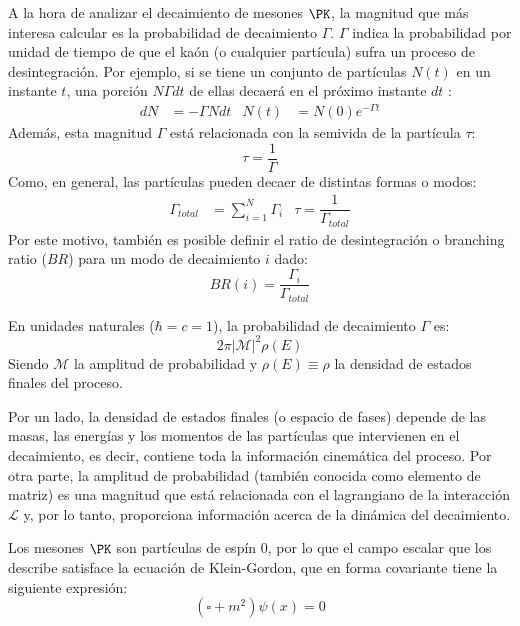 A la hora de analizar el decaimiento de mesones $\PK$, la magnitud que más interesa calcular es la probabilidad de decaimiento $\Gamma$. $\Gamma$ indica la probabilidad por unidad de tiempo de que el kaón (o cualquier partícula) sufra un proceso de desintegración. Por ejemplo, si se tiene un conjunto de partículas $N(t)$ en un instante $t$, una porción $N\Gamma dt$ de ellas decaerá en el próximo instante $dt$ \cite{Griffiths2008}:
\begin{align}
dN &= -\Gamma Ndt & N(t) &= N(0)e^{-\Gamma t}
\end{align}
Además, esta magnitud $\Gamma$ está relacionada con la semivida de la partícula $\tau$:
\begin{equation}
\tau=\dfrac{1}{\Gamma}
\end{equation}
Como, en general, las partículas pueden decaer de distintas formas o modos:
\begin{align}
\Gamma_{total} &= \sum_{i=1}^N \Gamma_i & \tau=\dfrac{1}{\Gamma_{total}}
\end{align}
Por este motivo, también es posible definir el ratio de desintegración o branching ratio ($BR$) para un modo de decaimiento $i$ dado:
\begin{equation}
BR(i)=\dfrac{\Gamma_{i}}{\Gamma_{total}}
\end{equation}

En unidades naturales ($\hbar=c=1$), la probabilidad de decaimiento $\Gamma$ es:
\begin{equation}
2\pi \left| \mathcal{M}\right| ^{2} \rho\left( E\right)
\end{equation} 
Siendo $\mathcal{M}$ la amplitud de probabilidad y $\rho\left(E\right) \equiv \rho$ la densidad de estados finales del proceso.

Por un lado, la densidad de estados finales (o espacio de fases) depende de las masas, las energías y los momentos de las partículas que intervienen en el decaimiento, es decir, contiene toda la información cinemática del proceso. Por otra parte, la amplitud de probabilidad (también conocida como elemento de matriz) es una magnitud que está relacionada con el lagrangiano de la interacción $\mathcal{L}$ y, por lo tanto, proporciona información acerca de la dinámica del decaimiento. 

Los mesones $\PK$ son partículas de espín 0, por lo que el campo escalar que los describe satisface la ecuación de Klein-Gordon, que en forma covariante tiene la siguiente expresión:
\begin{equation}
\left( \square +m^{2}\right) \psi \left( x\right) =0
\end{equation}

